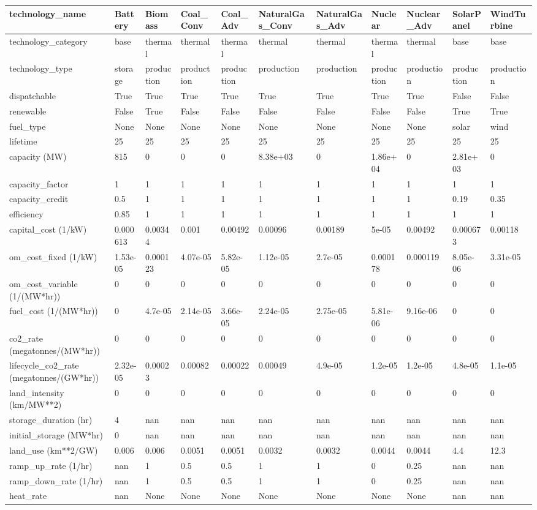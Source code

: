 \begin{tabular}{lllllllllll}
\toprule
technology\_name & Battery & Biomass & Coal\_Conv & Coal\_Adv & NaturalGas\_Conv & NaturalGas\_Adv & Nuclear & Nuclear\_Adv & SolarPanel & WindTurbine \\
\midrule
technology\_category & base & thermal & thermal & thermal & thermal & thermal & thermal & thermal & base & base \\
technology\_type & storage & production & production & production & production & production & production & production & production & production \\
dispatchable & True & True & True & True & True & True & True & True & False & False \\
renewable & False & True & False & False & False & False & False & False & True & True \\
fuel\_type & None & None & None & None & None & None & None & None & solar & wind \\
lifetime & 25 & 25 & 25 & 25 & 25 & 25 & 25 & 25 & 25 & 25 \\
capacity (MW) & 815 & 0 & 0 & 0 & 8.38e+03 & 0 & 1.86e+04 & 0 & 2.81e+03 & 0 \\
capacity\_factor & 1 & 1 & 1 & 1 & 1 & 1 & 1 & 1 & 1 & 1 \\
capacity\_credit & 0.5 & 1 & 1 & 1 & 1 & 1 & 1 & 1 & 0.19 & 0.35 \\
efficiency & 0.85 & 1 & 1 & 1 & 1 & 1 & 1 & 1 & 1 & 1 \\
capital\_cost (1/kW) & 0.000613 & 0.00344 & 0.001 & 0.00492 & 0.00096 & 0.00189 & 5e-05 & 0.00492 & 0.000673 & 0.00118 \\
om\_cost\_fixed (1/kW) & 1.53e-05 & 0.000123 & 4.07e-05 & 5.82e-05 & 1.12e-05 & 2.7e-05 & 0.000178 & 0.000119 & 8.05e-06 & 3.31e-05 \\
om\_cost\_variable (1/(MW*hr)) & 0 & 0 & 0 & 0 & 0 & 0 & 0 & 0 & 0 & 0 \\
fuel\_cost (1/(MW*hr)) & 0 & 4.7e-05 & 2.14e-05 & 3.66e-05 & 2.24e-05 & 2.75e-05 & 5.81e-06 & 9.16e-06 & 0 & 0 \\
co2\_rate (megatonnes/(MW*hr)) & 0 & 0 & 0 & 0 & 0 & 0 & 0 & 0 & 0 & 0 \\
lifecycle\_co2\_rate (megatonnes/(GW*hr)) & 2.32e-05 & 0.00023 & 0.00082 & 0.00022 & 0.00049 & 4.9e-05 & 1.2e-05 & 1.2e-05 & 4.8e-05 & 1.1e-05 \\
land\_intensity (km/MW**2) & 0 & 0 & 0 & 0 & 0 & 0 & 0 & 0 & 0 & 0 \\
storage\_duration (hr) & 4 & nan & nan & nan & nan & nan & nan & nan & nan & nan \\
initial\_storage (MW*hr) & 0 & nan & nan & nan & nan & nan & nan & nan & nan & nan \\
land\_use (km**2/GW) & 0.006 & 0.006 & 0.0051 & 0.0051 & 0.0032 & 0.0032 & 0.0044 & 0.0044 & 4.4 & 12.3 \\
ramp\_up\_rate (1/hr) & nan & 1 & 0.5 & 0.5 & 1 & 1 & 0 & 0.25 & nan & nan \\
ramp\_down\_rate (1/hr) & nan & 1 & 0.5 & 0.5 & 1 & 1 & 0 & 0.25 & nan & nan \\
heat\_rate & nan & None & None & None & None & None & None & None & nan & nan \\
\bottomrule
\end{tabular}
